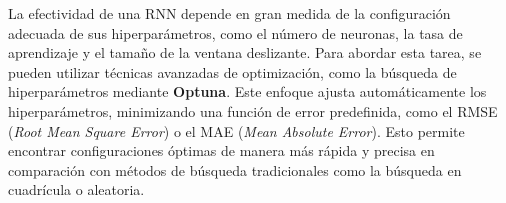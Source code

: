 La efectividad de una RNN depende en gran medida de la configuración adecuada de sus hiperparámetros, como el número de neuronas, la tasa de aprendizaje y el tamaño de la ventana deslizante. Para abordar esta tarea, se pueden utilizar técnicas avanzadas de optimización, como la búsqueda de hiperparámetros mediante \textbf{Optuna}. Este enfoque ajusta automáticamente los hiperparámetros, minimizando una función de error predefinida, como el RMSE (\textit{Root Mean Square Error}) o el MAE (\textit{Mean Absolute Error}). Esto permite encontrar configuraciones óptimas de manera más rápida y precisa en comparación con métodos de búsqueda tradicionales como la búsqueda en cuadrícula o aleatoria.